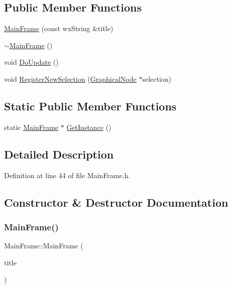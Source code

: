 \subsection*{Public Member Functions}
\begin{DoxyCompactItemize}
\item 
\hyperlink{class_main_frame_a00c85521dad6b24000967206bcc53688}{Main\+Frame} (const wx\+String \&title)
\item 
\hyperlink{class_main_frame_a0cfd88ece4836e0ea5430bd55370bf11}{$\sim$\+Main\+Frame} ()
\item 
void \hyperlink{class_main_frame_a3d8d476c8bb68d83d5dc006abb442851}{Do\+Update} ()
\item 
void \hyperlink{class_main_frame_af5c0679e1a94303e8bd0a0742c25a59b}{Register\+New\+Selection} (\hyperlink{class_graphical_node}{Graphical\+Node} $\ast$selection)
\end{DoxyCompactItemize}
\subsection*{Static Public Member Functions}
\begin{DoxyCompactItemize}
\item 
static \hyperlink{class_main_frame}{Main\+Frame} $\ast$ \hyperlink{class_main_frame_a17926c75eb083f5b8249696c4cdccf55}{Get\+Instance} ()
\end{DoxyCompactItemize}


\subsection{Detailed Description}


Definition at line 44 of file Main\+Frame.\+h.



\subsection{Constructor \& Destructor Documentation}
\mbox{\label{class_main_frame_a00c85521dad6b24000967206bcc53688}} 
\subsubsection{\texorpdfstring{Main\+Frame()}{MainFrame()}}
{\footnotesize\ttfamily Main\+Frame\+::\+Main\+Frame (\begin{DoxyParamCaption}\item[{const wx\+String \&}]{title }\end{DoxyParamCaption})}



